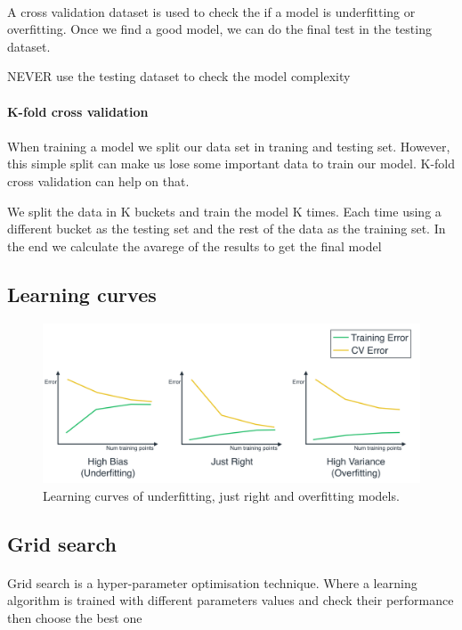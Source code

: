 \documentclass[]{article}
\begin{document}
\paragraph{} A cross validation dataset is used to check the if a model is underfitting or overfitting. Once we find a good model, we can do the final test in the testing dataset. 

NEVER use the testing dataset to check the model complexity

\paragraph{K-fold cross validation} 

\paragraph{} When training a model we split our data set in traning and testing set. However, this simple split can make us lose some important data to train our model. K-fold cross validation can help on that. 

We split the data in K buckets and train the model K times. Each time using a different bucket as the testing set and the rest of the data as the training set. In the end we calculate the avarege of the results to get the final model

\subsection{Learning curves}


\begin{figure}[ht!]
	\centering
		\includegraphics[width=15cm]{image/learning_curves.png}
		\caption{Learning curves of underfitting, just right and overfitting models.}
\end{figure}

\subsection{Grid search}

\paragraph{} Grid search is a hyper-parameter optimisation technique. Where a learning algorithm is trained with different parameters values and check their performance then choose the best one
\end{document}
